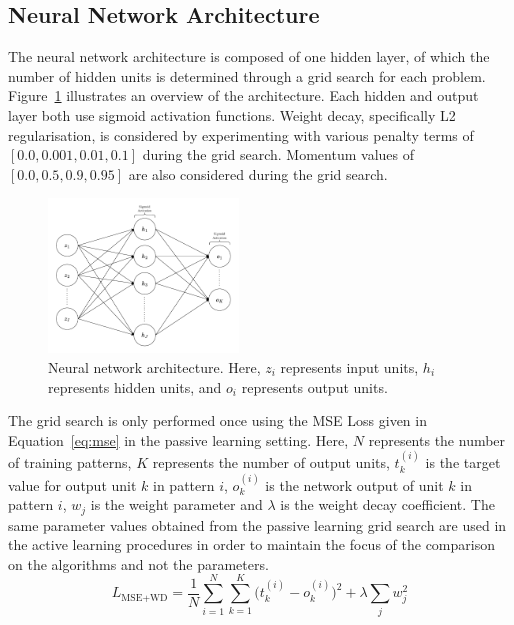 \documentclass[10pt, conference]{IEEEtran}
\begin{document}
\subsection{Neural Network Architecture}
The neural network architecture is composed of one hidden layer, of which the number of hidden units is determined through a grid search for each problem. Figure~\ref{fig:nnarch} illustrates an overview of the architecture. Each hidden and output layer both use sigmoid activation functions. Weight decay, specifically L2 regularisation, is considered by experimenting with various penalty terms of $[0.0, 0.001, 0.01, 0.1]$ during the grid search. Momentum values of $[0.0, 0.5, 0.9, 0.95]$ are also considered during the grid search. 

\begin{figure}[htbp]
	\centering
	\includegraphics[width=0.45\textwidth]{images/NNarch.pdf}
	\caption{Neural network architecture. Here, $z_i$ represents input units, $h_i$ represents hidden units, and $o_i$ represents output units.}
	\label{fig:nnarch}
\end{figure}

The grid search is only performed once using the MSE Loss given in Equation~\ref{eq:mse} in the passive learning setting. Here, $N$ represents the number of training patterns, $K$ represents the number of output units, $t_k^{(i)}$ is the target value for output unit $k$ in pattern $i$, $o_k^{(i)}$ is the network output of unit $k$ in pattern $i$, $w_j$ is the weight parameter and $\lambda$ is the weight decay coefficient. The same parameter values obtained from the passive learning grid search are used in the active learning procedures in order to maintain the focus of the comparison on the algorithms and not the parameters.
\begin{equation}
L_{\text{MSE+WD}} = \frac{1}{N} \sum_{i=1}^{N} \sum_{k=1}^{K} \big( t_{k}^{(i)} - o_{k}^{(i)} \big)^2
+\lambda \sum_{j} w_j^2
\label{eq:mse}
\end{equation}
\end{document}
